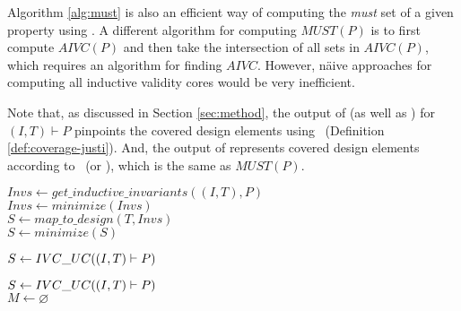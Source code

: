 Algorithm \ref{alg:must} is also an efficient way of computing the \emph{must} set of a given property using \ucalg. A different algorithm for computing $MUST (P)$ is to first compute $AIVC (P)$ and then take the intersection of all sets in $AIVC (P)$, which requires an algorithm for finding $AIVC$.  However, n{\"a}ive approaches for computing all inductive validity cores would be very inefficient.

Note that, as discussed in Section \ref{sec:method}, the
output of \ucalg (as well as \ucbfalg) for $(I, T) \vdash P$ pinpoints the covered design elements
using \ivccov\ (Definition \ref{def:coverage-justi}).
And, the output of \mustalg represents covered design elements according to \nondetcovalt\ (or \nondetcov ), which is the same as $MUST(P)$.

\vspace{-0.1in}
\begin{algorithm}
  \BlankLine
  $Invs \leftarrow get\_inductive\_invariants((I, T), P)$ \\
  $Invs \leftarrow minimize(Invs)$ \\
  $S \leftarrow map\_to\_design (T, Invs)$ \\
  $S \leftarrow minimize(S)$ \\
\caption{An abstract representation of \ucalg \cite{Ghass16}}
\label{alg:uc}
\end{algorithm}

\begin{algorithm}
  \BlankLine
  $S \leftarrow {IVC\_UC}((I, T) \vdash P)$ \\
   {
  }
\caption{An abstract representation of \ucbfalg \cite{Ghass16}}
\label{alg:ucbf}
\end{algorithm}

\begin{algorithm}
  \BlankLine
  $S \leftarrow {IVC\_UC}((I, T) \vdash P)$ \\
  $M \leftarrow \varnothing$ \\
   {
  }
\caption{\mustalg: an algorithm to compute $MUST(P)$ for a given $P$}
\label{alg:must}
\end{algorithm}

